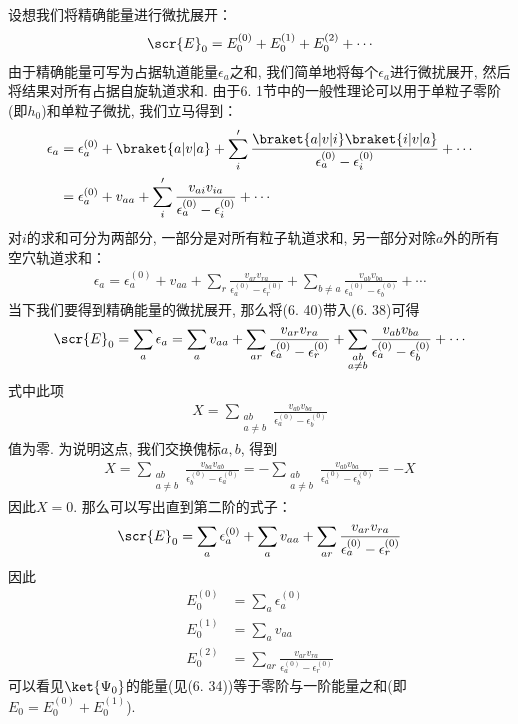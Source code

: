 设想我们将精确能量进行微扰展开：
\begin{align*}
\scr{E}_0 = E_0^{(0)} + E_0^{(1)} + E_0^{(2)} + \cdots
\end{align*}
由于精确能量可写为占据轨道能量$\epsilon_a$之和, 
 我们简单地将每个$\epsilon_a$进行微扰展开, 
然后将结果对所有占据自旋轨道求和. 
由于6.
1节中的一般性理论可以用于单粒子零阶\ha (即$h_0$)和单粒子微扰, 
我们立马得到：
\begin{align}
\epsilon_a & = \epsilon_a^{(0)} + \braket{a|v|a} + \sum_i'\frac{\braket{a|v|i}\braket{i|v|a}}{\epsilon_a^{(0)}-\epsilon_i^{(0)}} + \cdots\notag\\
	       & = \epsilon_a^{(0)} + v_{aa} + \sum_i'\frac{v_{ai}v_{ia}}{\epsilon_a^{(0)}-\epsilon_i^{(0)}} + \cdots
\end{align}
对$i$的求和可分为两部分, 
一部分是对所有粒子轨道求和, 
另一部分对除$a$外的所有空穴轨道求和：
\begin{align}
\epsilon_a = \epsilon_a^{(0)} + v_{aa} + \sum_r\frac{v_{ar}v_{ra}}{\epsilon_a^{(0)}-\epsilon_r^{(0)}} + \sum_{b\neq a}\frac{v_{ab}v_{ba}}{\epsilon_a^{(0)}-\epsilon_b^{(0)}} + \cdots
\end{align}
当下我们要得到精确能量的微扰展开, 
那么将(6.
40)带入(6.
38)可得
\begin{align}
\scr{E}_0 = \sum_a\epsilon_a = \sum_av_{aa} + \sum_{ar}\frac{v_{ar}v_{ra}}{\epsilon_a^{(0)} - \epsilon_{r}^{(0)}} + \sum_{\substack{ab\\a\neq b}}\frac{v_{ab}v_{ba}}{\epsilon_a^{(0)}- \epsilon_{b}^{(0)}} + \cdots
\end{align}
式中此项
\begin{align*}
X = \sum_{\substack{ab\\a\neq b}}\frac{v_{ab}v_{ba}}{\epsilon_a^{(0)}- \epsilon_{b}^{(0)}} 
\end{align*}
值为零. 
为说明这点, 
我们交换傀标$a,b$, 
得到
\begin{align*}
X = \sum_{\substack{ab\\a\neq b}}\frac{v_{ba}v_{ab}}{\epsilon_b^{(0)}- \epsilon_{a}^{(0)}}  = - \sum_{\substack{ab\\a\neq b}}\frac{v_{ab}v_{ba}}{\epsilon_a^{(0)}- \epsilon_{b}^{(0)}} = -X 
\end{align*}
因此$X=0$. 
那么可以写出直到第二阶的式子：
\begin{align}
\scr{E}_0 = \sum_a\epsilon_a^{(0)} + \sum_av_{aa} + \sum_{ar}\frac{v_{ar}v_{ra}}{\epsilon_a^{(0)} - \epsilon_{r}^{(0)}}
\end{align}
因此
\begin{subequations}
\begin{align}
E_0^{(0)} & = \sum_a\epsilon_a^{(0)}\\
E_0^{(1)} & = \sum_av_{aa} \label{6.43b}\\
E_0^{(2)} & = \sum_{ar}\frac{v_{ar}v_{ra}}{\epsilon_a^{(0)} - \epsilon_r^{(0)}}
\label{6.43c}
\end{align}
\end{subequations}
可以看见$\ket{\Psi_0}$的能量(见(6.
34))等于零阶与一阶能量之和(即$E_0 = E_0^{(0)}+E_0^{(1)}$).


